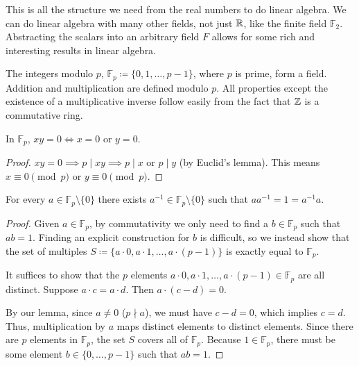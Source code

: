 \documentclass[../linear_algebra_and_groups.tex]{subfiles}
\begin{document}
\begin{remark}
    This is all the structure we need from the real numbers to do linear algebra. We can do linear algebra with many other fields, not just $\mathbb{R}$, like the finite field $\mathbb{F}_2$. Abstracting the scalars into an arbitrary field $F$ allows for some rich and interesting results in linear algebra.
\end{remark}

\begin{example}
    The integers modulo $p$, $\mathbb{F}_p\coloneqq\{0,1,\dots,p-1\}$, where $p$ is prime, form a field. Addition and multiplication are defined modulo $p$. All properties except the existence of a multiplicative inverse follow easily from the fact that $\mathbb{Z}$ is a commutative ring.
\end{example}

\begin{lemma}
    \begin{shaded*}
        In $\mathbb{F}_p$, $xy=0 \iff x=0 \text{ or } y=0$.
    \end{shaded*}
\end{lemma}
\begin{proof}
    $xy=0 \implies p\mid xy \implies p\mid x \text{ or } p\mid y$ (by Euclid's lemma). This means $x \equiv 0 \pmod p$ or $y \equiv 0 \pmod p$.
    \qedhere
\end{proof}

\begin{theorem}
    \begin{shaded*}
        For every $a\in\mathbb{F}_p\setminus\{0\}$ there exists $a^{-1}\in\mathbb{F}_p\setminus\{0\}$ such that $aa^{-1}=1=a^{-1}a$.
    \end{shaded*}
\end{theorem}
\begin{proof}
    Given $a\in\mathbb{F}_p$, by commutativity we only need to find a $b\in\mathbb{F}_p$ such that $ab=1$. Finding an explicit construction for $b$ is difficult, so we instead show that the set of multiples $S \coloneqq \{a\cdot 0, a\cdot 1, \dots, a\cdot(p-1)\}$ is exactly equal to $\mathbb{F}_p$.

    It suffices to show that the $p$ elements $a\cdot 0, a\cdot 1, \dots, a\cdot (p-1) \in \mathbb{F}_p$ are all distinct. Suppose $a\cdot c = a\cdot d$. Then $a\cdot(c-d) = 0$.
    
    By our lemma, since $a \neq 0$ ($p \nmid a$), we must have $c-d = 0$, which implies $c = d$. Thus, multiplication by $a$ maps distinct elements to distinct elements. Since there are $p$ elements in $\mathbb{F}_p$, the set $S$ covers all of $\mathbb{F}_p$. Because $1 \in \mathbb{F}_p$, there must be some element $b \in \{0, \dots, p-1\}$ such that $ab = 1$.
    \qedhere
\end{proof}
\end{document}
